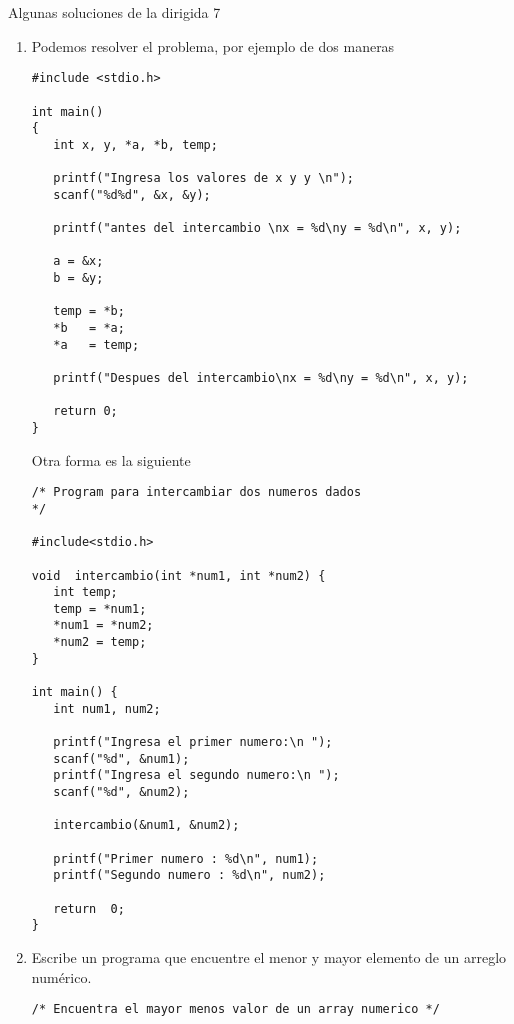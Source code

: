 \documentclass[twoside,10.5pt]{article}%
\begin{document}
\begin{center}
{\LARGE{Algunas soluciones de la  dirigida 7}}\\[20pt]
\end{center}

\vspace{0.3cm}

\begin{enumerate}
\item Podemos resolver el problema, por ejemplo de dos maneras

\begin{verbatim}
#include <stdio.h>
 
int main()
{
   int x, y, *a, *b, temp;
 
   printf("Ingresa los valores de x y y \n");
   scanf("%d%d", &x, &y);
 
   printf("antes del intercambio \nx = %d\ny = %d\n", x, y);
 
   a = &x;
   b = &y;
 
   temp = *b;
   *b   = *a;
   *a   = temp;
 
   printf("Despues del intercambio\nx = %d\ny = %d\n", x, y);
 
   return 0;
}
\end{verbatim}

Otra forma es la siguiente 

\begin{verbatim}
/* Program para intercambiar dos numeros dados 
*/

#include<stdio.h>
 
void  intercambio(int *num1, int *num2) {
   int temp;
   temp = *num1;
   *num1 = *num2;
   *num2 = temp;
}
 
int main() {
   int num1, num2;
 
   printf("Ingresa el primer numero:\n ");
   scanf("%d", &num1);
   printf("Ingresa el segundo numero:\n ");
   scanf("%d", &num2);
 
   intercambio(&num1, &num2);
 
   printf("Primer numero : %d\n", num1);
   printf("Segundo numero : %d\n", num2);
 
   return  0;
}
\end{verbatim}


\item Escribe un programa que encuentre el menor y mayor elemento de un  arreglo num\'erico.

\begin{verbatim}
/* Encuentra el mayor menos valor de un array numerico */



\end{verbatim}
\end{enumerate}
\end{document}
